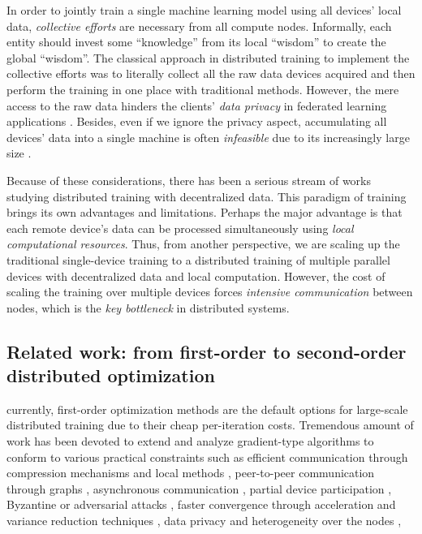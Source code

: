 \documentclass[11pt]{article}
\begin{document}
	In order to jointly train a single machine learning model using all devices' local data, {\em collective efforts} are necessary from all compute nodes. Informally, each entity should invest some ``knowledge'' from its local ``wisdom'' to create the global ``wisdom''. The classical approach in distributed training to implement the collective efforts was to literally collect all the raw data devices acquired and then perform the training in one place with traditional methods. However, the mere access to the raw data hinders the clients' {\em data privacy} in federated learning applications \citep{FEDLEARN,FEDOPT,FL2017-AISTATS}. Besides, even if we ignore the privacy aspect, accumulating all devices' data into a single machine is often {\em infeasible} due to its increasingly large size \citep{bekkerman2011scaling}.
	
	Because of these considerations, there has been a serious stream of works studying distributed training with decentralized data. This paradigm of training brings its own advantages and limitations. Perhaps the major advantage is that each remote device's data can be processed simultaneously using {\em local computational resources}. Thus, from another perspective, we are scaling up the traditional single-device training to a distributed training of multiple parallel devices with decentralized data and local computation. However, the cost of scaling the training over multiple devices forces {\em intensive communication} between nodes, which is the {\em key bottleneck} in distributed systems.
	
	
	\subsection{Related work: from first-order to second-order distributed optimization}
	currently, first-order optimization methods are the default options for large-scale distributed training due to their cheap per-iteration costs. Tremendous amount of work has been devoted to extend and analyze gradient-type algorithms to conform to various practical constraints such as 
	efficient communication through compression mechanisms \citep{qsgd,alistarh2018convergence,terngrad,tonko,Sahu2021threshold,Tyurin2022Dasha} and local methods \citep{Gorbunov2020localSGD,Stich-localSGD,ScAFFOLD,Nadiradze2021ADQL-SGD,Mishchenko2022ProxSkip},
	peer-to-peer communication through graphs \citep{Koloskova2019Decentralized,Koloskova2020Decentralized,Kovalev2021Decentralized},
	asynchronous communication \citep{Feyzmahdavian2021Asynchronous,Nadiradze2021Asynchronous},
	partial device participation \citep{Yang2021PP+nonIID},
	Byzantine or adversarial attacks \citep{Karimireddy2021Byzantine,Karimireddy2022Byzantine},
	faster convergence through acceleration \citep{allen2017katyusha,ADIANA,Qian2021EcLK} and variance reduction techniques \citep{Lee2017DSVRG,DIANA,DIANA-VR,cen2020DSVRG,MARINA},
	data privacy and heterogeneity over the nodes \citep{FL-big,FL_survey_2020},
	
\end{document}
